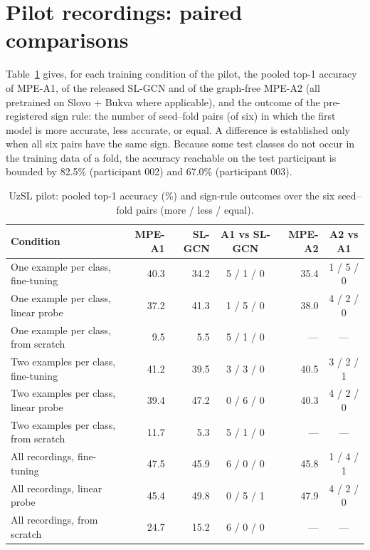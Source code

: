 \documentclass[a4paper,10pt]{article}
\begin{document}
\section{Pilot recordings: paired comparisons}
Table~\ref{tab:s_pilot} gives, for each training condition of the pilot, the pooled top-1 accuracy of MPE-A1, of the released SL-GCN and of the graph-free MPE-A2 (all pretrained on Slovo + Bukva where applicable), and the outcome of the pre-registered sign rule: the number of seed--fold pairs (of six) in which the first model is more accurate, less accurate, or equal. A difference is established only when all six pairs have the same sign. Because some test classes do not occur in the training data of a fold, the accuracy reachable on the test participant is bounded by 82.5\% (participant 002) and 67.0\% (participant 003).
\begin{table}[H]
\caption{UzSL pilot: pooled top-1 accuracy (\%) and sign-rule outcomes over the six seed--fold pairs (more / less / equal).}\label{tab:s_pilot}
\centering
\footnotesize
\begin{tabular}{lrrcrc}
\toprule
\textbf{Condition} & \textbf{MPE-A1} & \textbf{SL-GCN} & \textbf{A1 vs SL-GCN} & \textbf{MPE-A2} & \textbf{A2 vs A1} \\
\midrule
One example per class, fine-tuning & 40.3 & 34.2 & 5 / 1 / 0 & 35.4 & 1 / 5 / 0 \\
One example per class, linear probe & 37.2 & 41.3 & 1 / 5 / 0 & 38.0 & 4 / 2 / 0 \\
One example per class, from scratch & 9.5 & 5.5 & 5 / 1 / 0 & --- & --- \\
Two examples per class, fine-tuning & 41.2 & 39.5 & 3 / 3 / 0 & 40.5 & 3 / 2 / 1 \\
Two examples per class, linear probe & 39.4 & 47.2 & 0 / 6 / 0 & 40.3 & 4 / 2 / 0 \\
Two examples per class, from scratch & 11.7 & 5.3 & 5 / 1 / 0 & --- & --- \\
All recordings, fine-tuning & 47.5 & 45.9 & 6 / 0 / 0 & 45.8 & 1 / 4 / 1 \\
All recordings, linear probe & 45.4 & 49.8 & 0 / 5 / 1 & 47.9 & 4 / 2 / 0 \\
All recordings, from scratch & 24.7 & 15.2 & 6 / 0 / 0 & --- & --- \\
\bottomrule
\end{tabular}
\end{table}
\end{document}
